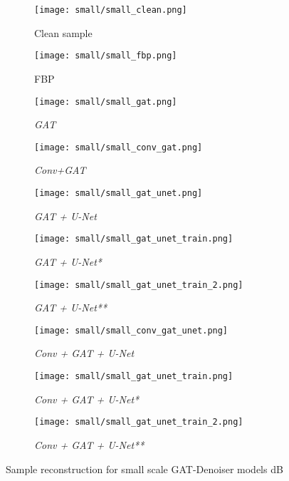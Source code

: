 \begin{figure}[H]
  \captionsetup[subfigure]{justification=centering}
  \centering
  \begin{subfigure}[t]{0.16\textwidth}
    \texttt{[image: small/small\_clean.png]}
    \caption{Clean sample}
    \label{fig:small_clean_sample_overview}
  \end{subfigure} \hfill
  \begin{subfigure}[t]{0.16\textwidth}
    \texttt{[image: small/small\_fbp.png]}
    \caption{FBP}
  \end{subfigure} \hfill
  \begin{subfigure}[t]{0.16\textwidth}
    \texttt{[image: small/small\_gat.png]}
    \caption{\textit{GAT}}
  \end{subfigure} \hfill
  \begin{subfigure}[t]{0.16\textwidth}
    \texttt{[image: small/small\_conv\_gat.png]}
    \caption{\textit{Conv+GAT}}
  \end{subfigure} \hfill
  \begin{subfigure}[t]{0.16\textwidth}
    \texttt{[image: small/small\_gat\_unet.png]}
    \caption{\textit{GAT + U-Net}}
  \end{subfigure}

  \begin{subfigure}[t]{0.16\textwidth}
    \texttt{[image: small/small\_gat\_unet\_train.png]}
    \caption{\textit{GAT + U-Net*}}
  \end{subfigure} \hfill
  \begin{subfigure}[t]{0.16\textwidth}
    \texttt{[image: small/small\_gat\_unet\_train\_2.png]}
    \caption{\textit{GAT + U-Net**}}
  \end{subfigure} \hfill
  \begin{subfigure}[t]{0.16\textwidth}
    \texttt{[image: small/small\_conv\_gat\_unet.png]}
    \caption{\textit{Conv + GAT + U-Net}}
  \end{subfigure} \hfill
  \begin{subfigure}[t]{0.16\textwidth}
    \texttt{[image: small/small\_gat\_unet\_train.png]}
    \caption{\textit{Conv + GAT + U-Net*}}
  \end{subfigure} \hfill
  \begin{subfigure}[t]{0.16\textwidth}
    \texttt{[image: small/small\_gat\_unet\_train\_2.png]}
    \caption{\textit{Conv + GAT + U-Net**}}
  \end{subfigure}
  \caption{Sample reconstruction for small scale GAT-Denoiser models  dB}
  \label{fig:small_components_overview}
\end{figure}

